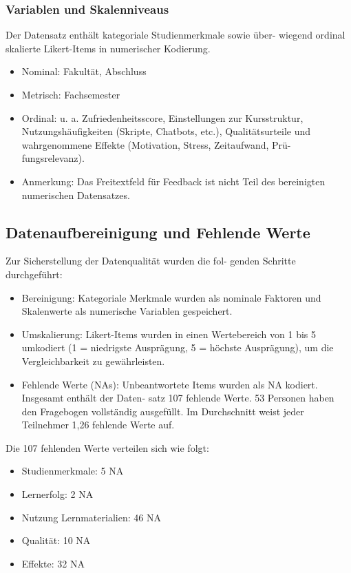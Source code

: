 \documentclass[a4paper, 12pt]{article}
\begin{document}
\subsubsection{Variablen und Skalenniveaus}
Der Datensatz enthält kategoriale Studienmerkmale sowie über-
wiegend ordinal skalierte Likert-Items in numerischer Kodierung.
\begin{itemize}
    \item Nominal: Fakultät, Abschluss
    \item Metrisch: Fachsemester
    \item Ordinal: u. a. Zufriedenheitsscore, Einstellungen zur Kursstruktur, Nutzungshäufigkeiten (Skripte, Chatbots, etc.), Qualitätsurteile und wahrgenommene Effekte (Motivation, Stress, Zeitaufwand, Prü-fungsrelevanz).
    \item Anmerkung: Das Freitextfeld für Feedback ist nicht Teil des bereinigten numerischen Datensatzes.
\end{itemize}

\subsection{Datenaufbereinigung und Fehlende Werte}
 Zur Sicherstellung der Datenqualität wurden die fol-
genden Schritte durchgeführt:
\begin{itemize}
    \item Bereinigung: Kategoriale Merkmale wurden als nominale Faktoren und Skalenwerte als numerische Variablen gespeichert.
    \item Umskalierung: Likert-Items wurden in einen Wertebereich von 1 bis 5 umkodiert (1 = niedrigste Ausprägung, 5 = höchste Ausprägung), um die Vergleichbarkeit zu gewährleisten.
    \item Fehlende Werte (NAs): Unbeantwortete Items wurden als NA kodiert. Insgesamt enthält der Daten- satz 107 fehlende Werte. 53 Personen haben den Fragebogen vollständig ausgefüllt. Im Durchschnitt weist jeder Teilnehmer 1,26 fehlende Werte auf.
\end{itemize}

Die 107 fehlenden Werte verteilen sich wie folgt:
\begin{itemize}
    \item Studienmerkmale: 5 NA
    \item Lernerfolg: 2 NA
    \item  Nutzung Lernmaterialien: 46 NA
    \item Qualität: 10 NA
    \item Effekte: 32 NA
\end{itemize}
\end{document}
